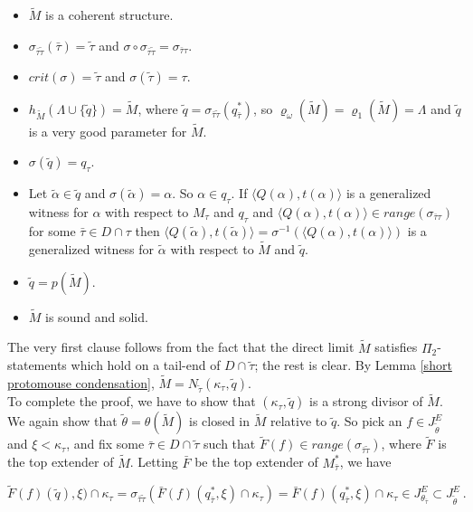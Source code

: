 \documentclass[12pt]{article}
\begin{document}
\begin{itemize}
\item{$\tilde{M}$ is a coherent structure.}
\item{$\sigma_{\bar{\tau} \tilde{\tau}} (\bar{\tau}) = \tilde{\tau}$ and $\sigma \circ \sigma_{\bar{\tau} \tilde{\tau}} = \sigma_{\bar{\tau} \tau}$.}
\item{$crit(\sigma) = \tilde{\tau}$ and $\sigma (\tilde{\tau}) = \tau$.}
\item{$h_{\tilde{M}} ( \Lambda \cup \{ \tilde{q} \} ) = \tilde{M}$, where $\tilde{q} = \sigma_{\bar{\tau} \tilde{\tau}} ( q_{\bar{\tau}}^* )$, so $\varrho_\omega (\tilde{M}) = \varrho_1 (\tilde{M}) = \Lambda$ and $\tilde{q}$ is a very good parameter for $\tilde{M}$.}
\item{$\sigma(\tilde{q}) = q_\tau$.}
\item{Let $\tilde{\alpha} \in \tilde{q}$ and $\sigma (\tilde{\alpha}) = \alpha$.  So $\alpha \in q_\tau$.  If $\langle Q ( \alpha ) , t(\alpha ) \rangle$ is a generalized witness for $\alpha$ with respect to $M_\tau$ and $q_\tau$ and $\langle Q (\alpha ) , t ( \alpha ) \rangle \in range ( \sigma_{\bar{\tau} \tau} )$ for some $\bar{\tau} \in D \cap \tau$ then $ \langle Q (\tilde{\alpha}), t ( \tilde{\alpha } ) \rangle = \sigma^{-1} ( \langle Q (\alpha ) , t (\alpha ) \rangle )$ is a generalized witness for $\tilde{\alpha}$ with respect to $\tilde{M}$ and $\tilde{q}$.}
\item{$\tilde{q} = p ( \tilde{M} )$.}
\item{$\tilde{M}$ is sound and solid.}
\end{itemize}

The very first clause follows from the fact that the direct limit $\tilde{M}$ satisfies $\Pi_2$-statements which hold on a tail-end of $D \cap \tilde{\tau}$; the rest is clear.  By Lemma \ref{short protomouse condensation}, $\tilde{M} = N_{\tilde{\tau}} ( \kappa_\tau , \tilde{q})$.\\  To complete the proof, we have to show that $(\kappa_\tau , \tilde{q})$ is a strong divisor of $\tilde{M}$.  We again show that $\tilde{\theta} = \theta ( \tilde{M})$ is closed in $\tilde{M}$ relative to $\tilde{q}$.  So pick an $f \in J_{\tilde{\theta}}^E$ and $\xi < \kappa_\tau$, and fix some $\bar{\tau} \in D \cap \tilde{\tau}$ such that $\tilde{F}(f) \in range ( \sigma_{\bar{\tau} \tilde{\tau}} )$, where $\tilde{F}$ is the top extender of $\tilde{M}$.  Letting $\bar{F}$ be the top extender of $M_{\bar{\tau}}^*$, we have

\[
\tilde{F} (f) ( \tilde{q}) , \xi) \cap \kappa_\tau = \sigma_{\bar{\tau} \tilde{\tau}} ( \bar{F} (f) (q_{\bar{\tau}}^* , \xi ) \cap \kappa_\tau ) = \bar{F} (f) ( q_{\bar{\tau}}^* , \xi ) \cap \kappa_\tau \in J_{\theta_{\bar{\tau}}}^E \subset J_{\tilde{\theta}}^E \ .
\]
\end{document}
